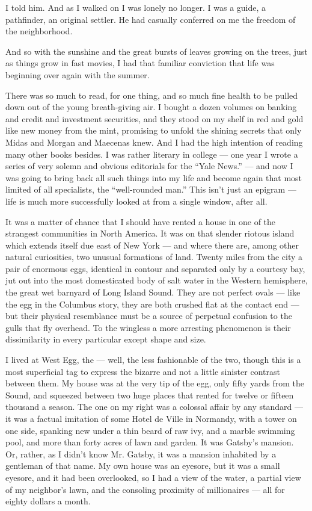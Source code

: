 \documentclass{znotebook}
\begin{document}
I told him. And as I walked on I was lonely no longer. I was a guide, a pathfinder, an original settler. He had casually conferred on me the freedom of the neighborhood.

And so with the sunshine and the great bursts of leaves growing on the trees, just as things grow in fast movies, I had that familiar conviction that life was beginning over again with the summer.

There was so much to read, for one thing, and so much fine health to be pulled down out of the young breath-giving air. I bought a dozen volumes on banking and credit and investment securities, and they stood on my shelf in red and gold like new money from the mint, promising to unfold the shining secrets that only Midas and Morgan and Maecenas knew. And I had the high intention of reading many other books besides. I was rather literary in college ---{} one year I wrote a series of very solemn and obvious editorials for the ``Yale News.'' ---{} and now I was going to bring back all such things into my life and become again that most limited of all specialists, the ``well-rounded man.'' This isn't just an epigram ---{} life is much more successfully looked at from a single window, after all.

It was a matter of chance that I should have rented a house in one of the strangest communities in North America. It was on that slender riotous island which extends itself due east of New York ---{} and where there are, among other natural curiosities, two unusual formations of land. Twenty miles from the city a pair of enormous eggs, identical in contour and separated only by a courtesy bay, jut out into the most domesticated body of salt water in the Western hemisphere, the great wet barnyard of Long Island Sound. They are not perfect ovals ---{} like the egg in the Columbus story, they are both crushed flat at the contact end ---{} but their physical resemblance must be a source of perpetual confusion to the gulls that fly overhead. To the wingless a more arresting phenomenon is their dissimilarity in every particular except shape and size.

I lived at West Egg, the ---{} well, the less fashionable of the two, though this is a most superficial tag to express the bizarre and not a little sinister contrast between them. My house was at the very tip of the egg, only fifty yards from the Sound, and squeezed between two huge places that rented for twelve or fifteen thousand a season. The one on my right was a colossal affair by any standard ---{} it was a factual imitation of some Hotel de Ville in Normandy, with a tower on one side, spanking new under a thin beard of raw ivy, and a marble swimming pool, and more than forty acres of lawn and garden. It was Gatsby's mansion. Or, rather, as I didn't know Mr. Gatsby, it was a mansion inhabited by a gentleman of that name. My own house was an eyesore, but it was a small eyesore, and it had been overlooked, so I had a view of the water, a partial view of my neighbor's lawn, and the consoling proximity of millionaires ---{} all for eighty dollars a month.
\end{document}
